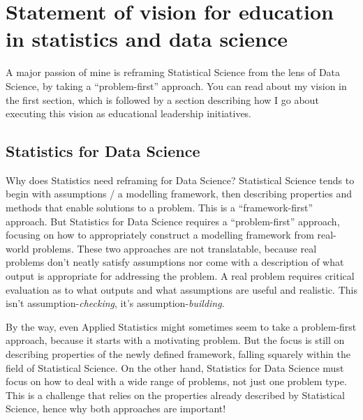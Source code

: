 \documentclass[]{article}
\begin{document}
\hypertarget{statement-of-vision-for-education-in-statistics-and-data-science}{%
\section{Statement of vision for education in statistics and data science}\label{statement-of-vision-for-education-in-statistics-and-data-science}}

A major passion of mine is reframing Statistical Science from the lens of Data Science, by taking a ``problem-first'' approach. You can read about my vision in the first section, which is followed by a section describing how I go about executing this vision as educational leadership initiatives.

\hypertarget{statistics-for-data-science}{%
\subsection{Statistics for Data Science}\label{statistics-for-data-science}}

Why does Statistics need reframing for Data Science? Statistical Science tends to begin with assumptions / a modelling framework, then describing properties and methods that enable solutions to a problem. This is a ``framework-first'' approach. But Statistics for Data Science requires a ``problem-first'' approach, focusing on how to appropriately construct a modelling framework from real-world problems. These two approaches are not translatable, because real problems don't neatly satisfy assumptions nor come with a description of what output is appropriate for addressing the problem. A real problem requires critical evaluation as to what outputs and what assumptions are useful and realistic. This isn't assumption-\emph{checking}, it's assumption-\emph{building}.

By the way, even Applied Statistics might sometimes seem to take a problem-first approach, because it starts with a motivating problem. But the focus is still on describing properties of the newly defined framework, falling squarely within the field of Statistical Science. On the other hand, Statistics for Data Science must focus on how to deal with a wide range of problems, not just one problem type. This is a challenge that relies on the properties already described by Statistical Science, hence why both approaches are important!
\end{document}
